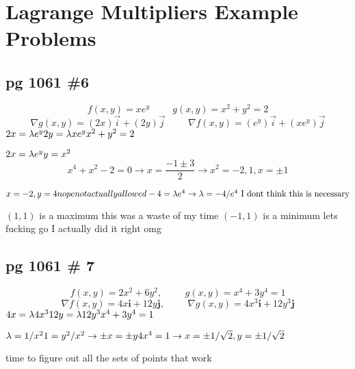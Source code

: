 \documentclass{report}
\begin{document}
\newpage
\section{Lagrange Multipliers Example Problems}
\subsection*{pg 1061 \#6}

$$
f(x, y) = xe^y \hspace{1cm} g(x, y) = x^2+y^2 = 2
$$
$$
\nabla g(x, y) = (2x)\vec{i} + (2y)\vec{j}
\hspace{1cm}
\nabla f(x, y) = (e^y)\vec{i} + (xe^y)\vec{j}
$$
$
2x = \lambda e^y \\
2y = \lambda xe^y \\
x^2 + y^2 = 2
$
\newline

\noindent $
2x = \lambda e^y \\
y = x^2 \\
$
$$
x^4 + x^2 - 2 = 0 \rightarrow x = \frac{-1 \pm 3}{2} \rightarrow x^2 = -2, 1, x= \pm 1
$$
\newline

$
x=-2, y=4 nope not actually allowed\\
-4 = \lambda e^{4} \rightarrow \lambda = -4/e^4 \text{ I dont think this is necessary}
$

$(1, 1)$ is a maximum this was a waste of my time 
$(-1, 1)$ is a minimum lets fucking go I actually did it right omg

\newpage
\subsection{pg 1061 \# 7}
$$
f(x, y) = 2x^2 + 6y^2,\hspace{1cm} g(x, y) = x^4 + 3y^4 = 1
$$
$$
\nabla f(x, y) = 4x \mathbf{i} + 12y \mathbf{j}, \hspace{1cm} 
\nabla g(x, y) = 4x^3 \mathbf{i} + 12y^3 \mathbf{j}
$$
$
4x = \lambda 4x^3 \\
12y = \lambda 12y^3 \\
x^4 + 3y^4 = 1
$
\newline

\noindent $
\lambda = 1/x^2 \\
1 = y^2/x^2 \rightarrow \pm x = \pm y \\
4x^4 = 1 \rightarrow x = \pm 1/\sqrt{2}, y = \pm 1/\sqrt{2}
$

time to figure out all the sets of points that work
\end{document}
